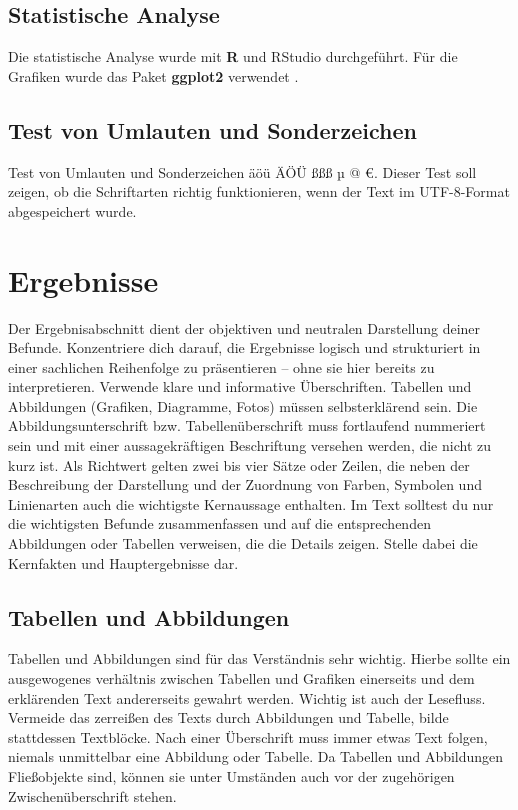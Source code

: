 \documentclass[fontsize=12pt,BCOR=12mm,logo/language=de]{tudcdreprt}
\begin{document}
\section{Statistische Analyse}

Die statistische Analyse wurde mit \textbf{R} \parencite{r-core-2024} und RStudio
\parencite{rstudio-2024} durchgeführt. Für die Grafiken
wurde das Paket \textbf{ggplot2} verwendet \parencite{wickham-ggplot2-2016}.

\section{Test von Umlauten und Sonderzeichen}

Test von Umlauten und Sonderzeichen äöü ÄÖÜ ßßß µ @ €. Dieser Test soll zeigen,
ob die Schriftarten richtig funktionieren, wenn der Text im UTF-8-Format
abgespeichert wurde.



\chapter{Ergebnisse}

Der Ergebnisabschnitt dient der objektiven und neutralen Darstellung deiner Befunde. Konzentriere dich darauf, die Ergebnisse logisch und strukturiert in einer sachlichen Reihenfolge zu präsentieren – ohne sie hier bereits zu interpretieren. Verwende klare und informative Überschriften. Tabellen und Abbildungen (Grafiken, Diagramme, Fotos) müssen selbsterklärend sein. Die Abbildungsunterschrift bzw. Tabellenüberschrift muss fortlaufend nummeriert sein und mit einer aussagekräftigen Beschriftung versehen werden, die nicht zu kurz ist. Als Richtwert gelten zwei bis vier Sätze oder Zeilen, die neben der Beschreibung der Darstellung und der Zuordnung von Farben, Symbolen und Linienarten auch die wichtigste Kernaussage enthalten. Im Text solltest du nur die wichtigsten Befunde zusammenfassen und auf die entsprechenden Abbildungen oder Tabellen verweisen, die die Details zeigen. Stelle dabei die Kernfakten und Hauptergebnisse dar.



\section{Tabellen und Abbildungen}

Tabellen und Abbildungen sind für das Verständnis sehr wichtig. Hierbe sollte ein ausgewogenes verhältnis zwischen Tabellen und Grafiken einerseits und dem erklärenden Text andererseits gewahrt werden. Wichtig ist auch der Lesefluss. Vermeide das zerreißen des Texts durch Abbildungen und Tabelle, bilde stattdessen Textblöcke. Nach einer Überschrift muss immer etwas Text folgen, niemals unmittelbar eine Abbildung oder Tabelle. Da Tabellen und Abbildungen Fließobjekte sind, können sie unter Umständen auch vor der zugehörigen Zwischenüberschrift stehen.
\end{document}

